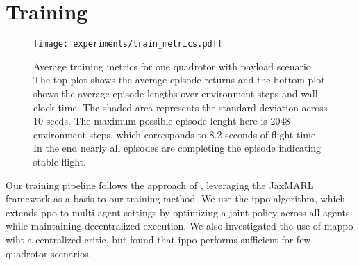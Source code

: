 

\section{Training}
\begin{figure}[ht]
    \centering
    
    \texttt{[image: experiments/train\_metrics.pdf]}
    \caption[Training Metrics]{Average training metrics for one quadrotor with payload scenario. The top plot shows the average episode returns and the bottom plot shows the average episode lengths over environment steps and wall-clock time. The shaded area represents the standard deviation across 10 seeds. The maximum possible episode lenght here is 2048 environment steps, which corresponds to 8.2 seconds of flight time. In the end nearly all episodes are completing the episode indicating stable flight.}
    \label{fig:train_metrics}
\end{figure}
Our training pipeline follows the approach of \autocite{flair2023jaxmarl}, leveraging the JaxMARL framework as a basis to our training method. We use the \gls{ippo} algorithm, which extends \gls{ppo} to multi-agent settings by optimizing a joint policy across all agents while maintaining decentralized execution. We also investigated the use of \gls{mappo} wiht a centralized critic, but found that \gls{ippo} performs sufficient for few quadrotor scenarios.

